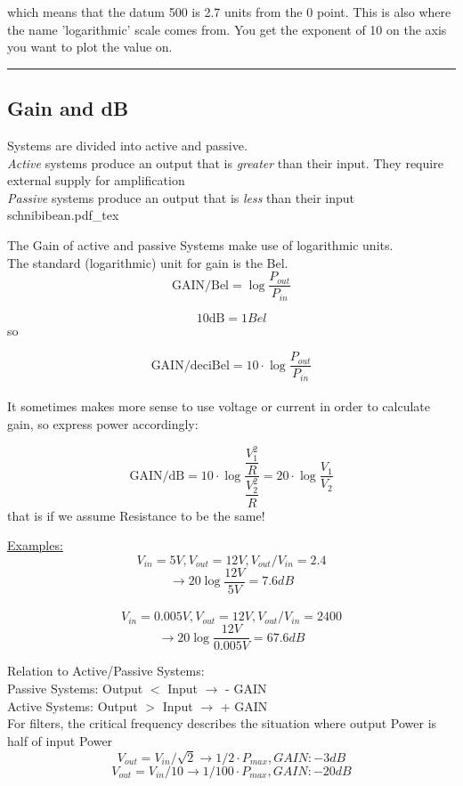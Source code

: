 \documentclass[a4paper, 12pt]{article}
\newcommand{\holine}{
  \noindent\rule{\textwidth}{0.618pt}
}
\newcommand{\inklude}[1]{%
    \def\svgwidth{\columnwidth}
    {#1.pdf_tex}
}
\begin{document}
which means that the datum 500 is 2.7 units from the 0 point. This is also where
the name 'logarithmic' scale comes from.
You get the exponent of 10 on the axis you want to plot the value on.

\holine

\subsection*{Gain and dB}
Systems are divided into active and passive.\\

\textit{Active} systems produce an output that is \textit{greater} than their
input. They require external supply for amplification\\

\textit{Passive} systems produce an output that is \textit{less} than their
input\\

\inklude{schnibibean}

The Gain of active and passive Systems make use of logarithmic units.\\

The standard (logarithmic) unit for gain is the Bel.\\

$$\textrm{GAIN/Bel} = \log{\frac{P_{out}}{P_{in}}}$$

$$10 \textrm{dB} = 1 Bel$$ so

$$\textrm{GAIN/deciBel} = 10 \cdot \log{\frac{P_{out}}{P_{in}}}$$\\

It sometimes makes more sense to use voltage or current in order to calculate
gain, so express power accordingly:

$$\textrm{GAIN/dB} = 10 \cdot \log{\frac{\dfrac{V_1^2}{R}}{\dfrac{V_2^2}{R}}} =
20 \cdot \log{\frac{V_1}{V_2}}$$ that is if we assume Resistance to be the same!

\underline{Examples:}\\
$$V_{in} = 5V, V_{out} = 12V, V_{out}/V_{in} = 2.4$$
$$\rightarrow 20 \log{\frac{12V}{5V}} = 7.6 dB$$\\

$$V_{in} = 0.005V, V_{out} = 12V, V_{out}/V_{in} = 2400$$
$$\rightarrow 20 \log{\frac{12V}{0.005V}} = 67.6 dB$$

Relation to Active/Passive Systems:\\[0.5cm]

Passive Systems: Output $<$ Input $\rightarrow$ - GAIN\\
Active Systems: Output $>$ Input $\rightarrow$ + GAIN\\

For filters, the critical frequency describes the situation where output Power
is half of input Power
$$ V_{out} = V_{in} / \sqrt{2} \rightarrow 1/2 \cdot P_{max}, GAIN: -3 dB$$
$$ V_{out} = V_{in} / 10 \rightarrow 1/100 \cdot P_{max}, GAIN: -20 dB$$
\end{document}
